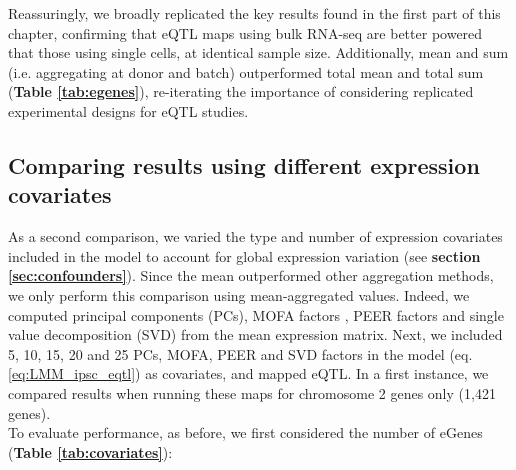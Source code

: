 Reassuringly, we broadly replicated the key results found in the first part of this chapter, confirming that eQTL maps using bulk RNA-seq are better powered that those using single cells, at identical sample size.
Additionally, mean and sum (i.e. aggregating at donor and batch) outperformed total mean and total sum (\textbf{Table \ref{tab:egenes}}), re-iterating the importance of considering replicated experimental designs for eQTL studies.



\subsection{Comparing results using different expression covariates}


As a second comparison, we varied the type and number of expression covariates included in the model to account for global expression variation (see \textbf{section 
\ref{sec:confounders}}).
Since the mean outperformed other aggregation methods, we only perform this comparison using mean-aggregated values.
Indeed, we computed principal components (PCs), MOFA factors \cite{argelaguet2018multi}, PEER factors \cite{stegle2010bayesian,stegle2012using} and single value decomposition (SVD) from the mean expression matrix. 
Next, we included 5, 10, 15, 20 and 25 PCs, MOFA, PEER and SVD factors in the model (eq. \eqref{eq:LMM_ipsc_eqtl}) as covariates, and mapped eQTL.
In a first instance, we compared results when running these maps for chromosome 2 genes only (1,421 genes). \\

To evaluate performance, as before, we first considered the number of eGenes (\textbf{Table \ref{tab:covariates}}):




